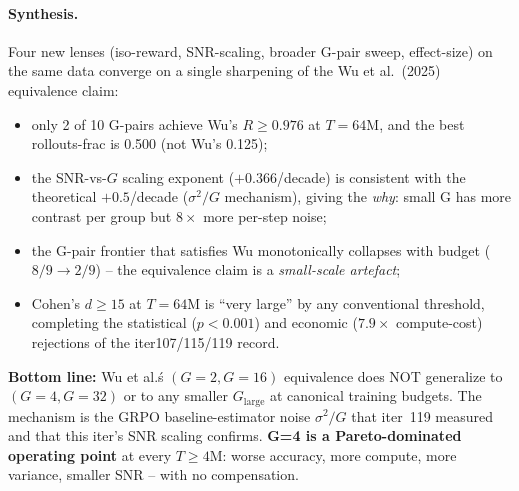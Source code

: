 \paragraph{Synthesis.}
Four new lenses (iso-reward, SNR-scaling, broader G-pair sweep,
effect-size) on the same data converge on a single sharpening of the
Wu et al.\ (2025) equivalence claim:
\begin{itemize}
\item only 2 of 10 G-pairs achieve Wu's $R\ge 0.976$ at $T{=}64$M,
  and the best rollouts-frac is 0.500 (not Wu's 0.125);
\item the SNR-vs-$G$ scaling exponent ($+0.366$/decade) is consistent
  with the theoretical $+0.5$/decade ($\sigma^2/G$ mechanism), giving
  the \emph{why}: small G has more contrast per group but $8\times$
  more per-step noise;
\item the G-pair frontier that satisfies Wu monotonically collapses
  with budget ($8/9 \to 2/9$) -- the equivalence claim is a
  \emph{small-scale artefact};
\item Cohen's $d\ge 15$ at $T{=}64$M is ``very large'' by any
  conventional threshold, completing the statistical ($p<0.001$)
  and economic ($7.9\times$ compute-cost) rejections of the
  iter107/115/119 record.
\end{itemize}
\textbf{Bottom line:} Wu et al.\'s $(G{=}2, G{=}16)$ equivalence does
NOT generalize to $(G{=}4, G{=}32)$ or to any smaller
$G_{\mathrm{large}}$ at canonical training budgets.  The
mechanism is the GRPO baseline-estimator noise $\sigma^2/G$ that
iter~119 measured and that this iter's SNR scaling confirms.
\textbf{G=4 is a Pareto-dominated operating point} at every
$T\ge 4$M: worse accuracy, more compute, more variance, smaller
SNR -- with no compensation.